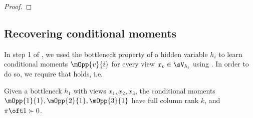 \begin{proof}
% 



\end{proof}

\subsection{Recovering conditional moments}

In step 1 of \LearnMarginals, we used the bottleneck property of a hidden
  variable $h_i$ to learn conditional moments $\mOpp{v}{i}$ for every
  view $x_v \in \sV_{h_i}$ using \TensorFactorize. 
In order to do so, we require that  holds, i.e.
\begin{assumption*}[1]
  Given a bottleneck $h_1$ with views $x_1, x_2, x_3$, the conditional
  moments $\mOpp{1}{1}, \mOpp{2}{1}, \mOpp{3}{1}$ have full column rank
  $k$, and $\pi\oft 1 \succ 0$.
\end{assumption*}

